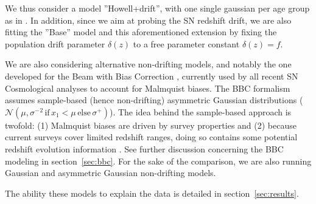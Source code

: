 \documentclass[]{aa} %
\newcommand{\nn}[1]{{\textcolor[rgb]{1, 0.27, 0}{#1}}}
\begin{document}

\nn{We thus consider a model ''Howell+drift'', with one single gaussian per age
group as in \citet{howell2007}}. In addition, since we aim at probing the SN
redshift drift, we are also fitting the ''Base'' model and \nn{this
aforementioned extension} by fixing the population drift parameter $\delta(z)$
to a free parameter constant $\delta(z)=f$. 

We are also considering alternative non-drifting models, and notably the one
developed for the Beam with Bias Correction \cite[BBC,][]{scolnic2016,
kessler2017}, currently used by all recent SN Cosmological analyses
\cite[e.g.][]{scolnic2018a, descosmopaper2019, riess2016, riess2019} to account
for Malmquist biases. The BBC formalism assumes sample-based (hence
non-drifting) asymmetric Gaussian distributions ($\mathcal{N}\left(\mu,
\sigma^{-}{}^2\, \mathrm{if}\,x_1<\mu\,\mathrm{else}\, \sigma^{+}\right)$). The
idea behind the sample-based approach is twofold: (1) Malmquist biases are
driven by survey properties and (2) because current surveys cover limited
redshift ranges, doing so contains some potential redshift evolution information
\citep{scolnic2016, scolnic2018a}. See further discussion concerning the BBC
modeling in section~\ref{sec:bbc}. For the sake of the comparison, we are also
running Gaussian and asymmetric Gaussian non-drifting models. 

The ability these models to explain the data is detailed in
section~\ref{sec:results}.
\end{document}
